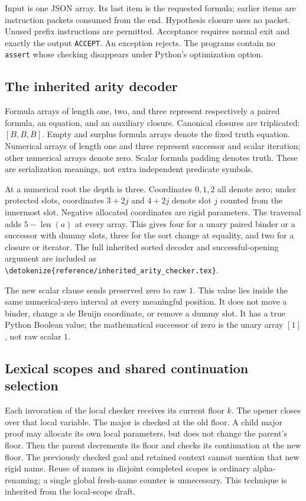 \documentclass[11pt,letterpaper]{article}
\theoremstyle{definition}\newtheorem{definition}[theorem]{Definition}
\theoremstyle{remark}\newtheorem{remark}[theorem]{Remark}
\newcommand{\file}[1]{\expandafter\nolinkurl\expandafter{\detokenize{#1}}}
\begin{document}


Input is one JSON array. Its last item is the requested formula; earlier
items are instruction packets consumed from the end. Hypothesis closure
uses no packet. Unused prefix instructions are permitted. Acceptance
requires normal exit and exactly the output \texttt{ACCEPT}. An exception
rejects. The programs contain no \texttt{assert} whose checking disappears
under Python's optimization option.

\subsection{The inherited arity decoder}

Formula arrays of length one, two, and three represent respectively a
paired formula, an equation, and an auxiliary closure. Canonical closures
are triplicated: $[B,B,B]$. Empty and surplus formula arrays denote the
fixed truth equation. Numerical arrays of length one and three represent
successor and scalar iteration; other numerical arrays denote zero.
Scalar formula padding denotes truth. These are serialization meanings,
not extra independent predicate symbols.

At a numerical root the depth is three. Coordinates $0,1,2$ all denote
zero; under protected slots, coordinates $3+2j$ and $4+2j$ denote slot $j$
counted from the innermost slot. Negative allocated coordinates are rigid
parameters. The traversal adds $5-\operatorname{len}(a)$ at every array.
This gives four for a unary paired binder or a successor with dummy slots,
three for the sort change at equality, and two for a closure or iterator.
The full inherited sorted decoder and successful-opening argument are
included as \file{reference/inherited_arity_checker.tex}.

The new scalar clause sends preserved zero to raw $1$. This value lies
inside the same numerical-zero interval at every meaningful position.
It does not move a binder, change a de Bruijn coordinate, or remove a dummy
slot. It has a true Python Boolean value; the mathematical successor of
zero is the unary array $[1]$, not raw scalar $1$.

\subsection{Lexical scopes and shared continuation selection}

Each invocation of the local checker receives its current floor $k$.
The opener closes over that local variable. The major is checked at the
old floor. A child major proof may allocate its own local parameters, but
does not change the parent's floor. Then the parent decrements its floor
and checks its continuation at the new floor. The previously checked goal
and retained context cannot mention that new rigid name. Reuse of names
in disjoint completed scopes is ordinary alpha-renaming; a single global
fresh-name counter is unnecessary. This technique is inherited from the
local-scope draft.\cite{local}
\end{document}
